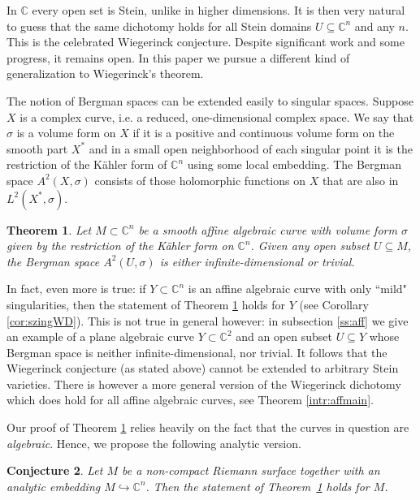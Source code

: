 \documentclass[11pt]{amsart}
\newtheorem{theorem}{Theorem}[section]
\newtheorem{conj}[theorem]{Conjecture}
\theoremstyle{definition}
\newcommand{\bC}{{\mathbb C}}
\begin{document}
In $\bC$ every open set is Stein, unlike in higher dimensions. It is then very natural to guess that the same dichotomy holds for all Stein domains $U \subseteq \bC^n$ and any $n$. This is the celebrated Wiegerinck conjecture. Despite significant work and some progress, it remains open. In this paper we pursue a different kind of generalization to Wiegerinck’s theorem.\vspace{3mm}

\noindent The notion of Bergman spaces can be extended easily to singular spaces. Suppose $X$ is a complex curve, i.e. a reduced, one-dimensional complex space. We say that $\sigma$ is a volume form on $X$ if it is a positive and continuous volume form on the smooth part $X^*$ and in a small open neighborhood of each singular point it is the restriction of the K\"ahler form of $\bC^n$ using some local embedding.  
 The Bergman space $A^2(X,\sigma)$ consists of those holomorphic functions on $X$ that are also in $L^2(X^*,\sigma).$

\begin{theorem}\label{intr:simaffin}
     \textit{Let $M \subset \bC^n$ be a smooth affine algebraic curve with volume form $\sigma$ given by the restriction of the Kähler form on $\bC^n$. Given any open subset $U \subseteq M$, the Bergman space $A^2(U,\sigma)$ is either infinite-dimensional or trivial.}
\end{theorem}

\noindent In fact, even more is true: if $Y\subset \bC^n$ is an affine algebraic curve with only ``mild" singularities, then the statement of Theorem \ref{intr:simaffin} holds for $Y$ (see Corollary \ref{cor:szingWD}). This is not true in general however: in subsection \ref{ss:aff} we give an example of a plane algebraic curve $Y \subset \bC^2$ and an open subset $U\subseteq Y$ whose Bergman space is neither infinite-dimensional, nor trivial. It follows that the Wiegerinck conjecture (as stated above) cannot be extended to arbitrary Stein varieties. There is however a more general version of the Wiegerinck dichotomy which does hold for all affine algebraic curves, see Theorem \ref{intr:affmain}.

Our proof of Theorem \ref{intr:simaffin} relies heavily on the fact that the curves in question are \emph{algebraic}. Hence, we propose the following analytic version.

\begin{conj}
    Let $M$ be a non-compact Riemann surface together with an analytic embedding $M \hookrightarrow \bC^n$. Then the statement of Theorem~\ref{intr:simaffin} holds for $M$.
\end{conj}
\end{document}
